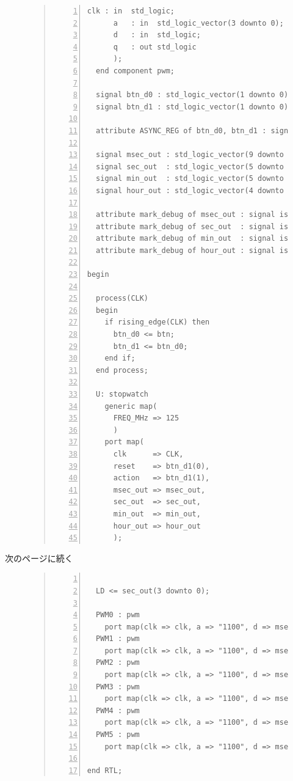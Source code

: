 \documentclass[a4paper,dvipdfmx]{jsarticle}
\begin{document}
\begin{figure}[H]
\begin{quote}
\begin{Verbatim}[frame=single, numbers=left, baselinestretch=0.8]
      clk : in  std_logic;
      a   : in  std_logic_vector(3 downto 0);
      d   : in  std_logic;
      q   : out std_logic
      );
  end component pwm;

  signal btn_d0 : std_logic_vector(1 downto 0);
  signal btn_d1 : std_logic_vector(1 downto 0);
  
  attribute ASYNC_REG of btn_d0, btn_d1 : signal is "TRUE";

  signal msec_out : std_logic_vector(9 downto 0);
  signal sec_out  : std_logic_vector(5 downto 0);
  signal min_out  : std_logic_vector(5 downto 0);
  signal hour_out : std_logic_vector(4 downto 0);

  attribute mark_debug of msec_out : signal is "true";
  attribute mark_debug of sec_out  : signal is "true";
  attribute mark_debug of min_out  : signal is "true";
  attribute mark_debug of hour_out : signal is "true";

begin

  process(CLK)
  begin
    if rising_edge(CLK) then
      btn_d0 <= btn;
      btn_d1 <= btn_d0;
    end if;
  end process;

  U: stopwatch
    generic map(
      FREQ_MHz => 125
      )
    port map(
      clk      => CLK,
      reset    => btn_d1(0),
      action   => btn_d1(1),
      msec_out => msec_out,
      sec_out  => sec_out,
      min_out  => min_out,
      hour_out => hour_out
      );
\end{Verbatim}
\end{quote}
\end{figure}
次のページに続く
\begin{figure}[H]
\begin{quote}
\begin{Verbatim}[frame=single, numbers=left, baselinestretch=0.8]

  LD <= sec_out(3 downto 0);
  
  PWM0 : pwm
    port map(clk => clk, a => "1100", d => msec_out(0), q => led5_r);
  PWM1 : pwm
    port map(clk => clk, a => "1100", d => msec_out(1), q => led5_g);
  PWM2 : pwm
    port map(clk => clk, a => "1100", d => msec_out(2), q => led5_b);
  PWM3 : pwm
    port map(clk => clk, a => "1100", d => msec_out(3), q => led6_r);
  PWM4 : pwm
    port map(clk => clk, a => "1100", d => msec_out(4), q => led6_g);
  PWM5 : pwm
    port map(clk => clk, a => "1100", d => msec_out(5), q => led6_b);

end RTL;
\end{Verbatim}
\end{quote}
\end{figure}
\end{document}
